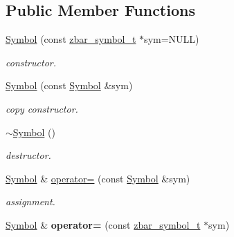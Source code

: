 \subsection*{Public Member Functions}
\begin{DoxyCompactItemize}
\item 
\hypertarget{classzbar_1_1_symbol_afd11227460e70ec1b45d5e9f90a0b9ee}{
\hyperlink{classzbar_1_1_symbol_afd11227460e70ec1b45d5e9f90a0b9ee}{Symbol} (const \hyperlink{zbar_8h_a55b659c1945f2984b5ec8386127e5c43}{zbar\_\-symbol\_\-t} $\ast$sym=NULL)}
\label{classzbar_1_1_symbol_afd11227460e70ec1b45d5e9f90a0b9ee}

\begin{DoxyCompactList}\small\item\em constructor. \end{DoxyCompactList}\item 
\hypertarget{classzbar_1_1_symbol_a70f15b9e178635ac13da6499df2e33ed}{
\hyperlink{classzbar_1_1_symbol_a70f15b9e178635ac13da6499df2e33ed}{Symbol} (const \hyperlink{classzbar_1_1_symbol}{Symbol} \&sym)}
\label{classzbar_1_1_symbol_a70f15b9e178635ac13da6499df2e33ed}

\begin{DoxyCompactList}\small\item\em copy constructor. \end{DoxyCompactList}\item 
\hypertarget{classzbar_1_1_symbol_a2453a7276e4e5bdd5c7be7dd3b26f73c}{
\hyperlink{classzbar_1_1_symbol_a2453a7276e4e5bdd5c7be7dd3b26f73c}{$\sim$Symbol} ()}
\label{classzbar_1_1_symbol_a2453a7276e4e5bdd5c7be7dd3b26f73c}

\begin{DoxyCompactList}\small\item\em destructor. \end{DoxyCompactList}\item 
\hypertarget{classzbar_1_1_symbol_a3b816fc6b3f09e44c9e63738ab3d2199}{
\hyperlink{classzbar_1_1_symbol}{Symbol} \& \hyperlink{classzbar_1_1_symbol_a3b816fc6b3f09e44c9e63738ab3d2199}{operator=} (const \hyperlink{classzbar_1_1_symbol}{Symbol} \&sym)}
\label{classzbar_1_1_symbol_a3b816fc6b3f09e44c9e63738ab3d2199}

\begin{DoxyCompactList}\small\item\em assignment. \end{DoxyCompactList}\item 
\hypertarget{classzbar_1_1_symbol_a72b0c4e587d555b62449073b5e86c6ad}{
\hyperlink{classzbar_1_1_symbol}{Symbol} \& {\bfseries operator=} (const \hyperlink{zbar_8h_a55b659c1945f2984b5ec8386127e5c43}{zbar\_\-symbol\_\-t} $\ast$sym)}
\label{classzbar_1_1_symbol_a72b0c4e587d555b62449073b5e86c6ad}


\end{DoxyCompactItemize}
